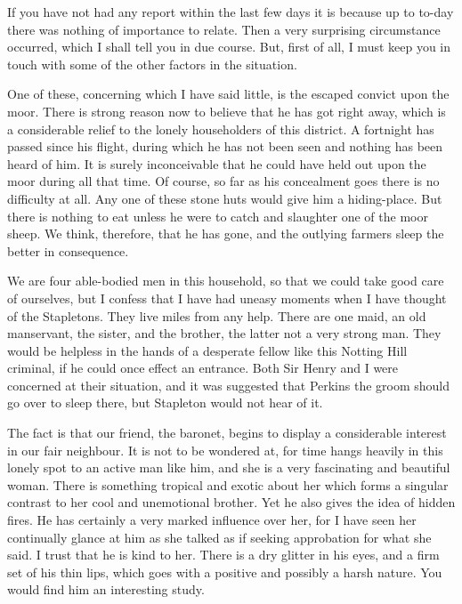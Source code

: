 If you have not had any report within the last few days it is because up to to-day there was nothing of importance to relate. Then a very surprising circumstance occurred, which I shall tell you in due course. But, first of all, I must keep you in touch with some of the other factors in the situation.

One of these, concerning which I have said little, is the escaped convict upon the moor. There is strong reason now to believe that he has got right away, which is a considerable relief to the lonely householders of this district. A fortnight has passed since his flight, during which he has not been seen and nothing has been heard of him. It is surely inconceivable that he could have held out upon the moor during all that time. Of course, so far as his concealment goes there is no difficulty at all. Any one of these stone huts would give him a hiding-place. But there is nothing to eat unless he were to catch and slaughter one of the moor sheep. We think, therefore, that he has gone, and the outlying farmers sleep the better in consequence.

We are four able-bodied men in this household, so that we could take good care of ourselves, but I confess that I have had uneasy moments when I have thought of the Stapletons. They live miles from any help. There are one maid, an old manservant, the sister, and the brother, the latter not a very strong man. They would be helpless in the hands of a desperate fellow like this Notting Hill criminal, if he could once effect an entrance. Both Sir Henry and I were concerned at their situation, and it was suggested that Perkins the groom should go over to sleep there, but Stapleton would not hear of it.

The fact is that our friend, the baronet, begins to display a considerable interest in our fair neighbour. It is not to be wondered at, for time hangs heavily in this lonely spot to an active man like him, and she is a very fascinating and beautiful woman. There is something tropical and exotic about her which forms a singular contrast to her cool and unemotional brother. Yet he also gives the idea of hidden fires. He has certainly a very marked influence over her, for I have seen her continually glance at him as she talked as if seeking approbation for what she said. I trust that he is kind to her. There is a dry glitter in his eyes, and a firm set of his thin lips, which goes with a positive and possibly a harsh nature. You would find him an interesting study.

